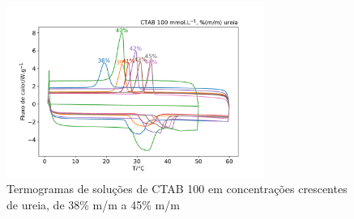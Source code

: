 	\begin{figure}[H]
		\centering
		\includegraphics[width=0.75\textwidth]{./imagens/dsc/CTAB_porc_ur}
		\caption{Termogramas de soluções de CTAB 100 \mM{} em concentrações crescentes de ureia, de 38\% m/m a 45\% m/m}
		\label{fig:DSC_CTAB_UR38-45}
	\end{figure}
	
